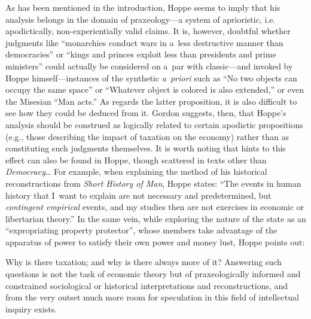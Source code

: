 As has been mentioned in the introduction, Hoppe seems to imply that his analysis belongs in the domain of praxeology---a system of aprioristic, i.e. apodictically, non-experientially valid claims. It is, however, doubtful whether judgments like ``monarchies conduct wars in a~less destructive manner than democracies'' or ``kings and princes exploit less than presidents and prime ministers'' could actually be considered on a~par with classic---and invoked by Hoppe 
\parencite*[][p.xvi]{hoppe_democracy_2007} %
 himself---instances of the synthetic \textit{a~priori} such as ``No two objects can occupy the same space'' or ``Whatever object is colored is also extended,'' or even the Misesian ``Man acts.'' As regards the latter proposition, it is also difficult to see how they could be deduced from it. Gordon 
\parencite*[][p.99]{gordon_austro-libertarian_2017} %
 suggests, then, that Hoppe's analysis should be construed as logically related to certain apodictic propositions (e.g., those describing the impact of taxation on the economy) rather than as constituting such judgments themselves. It is worth noting that hints to this effect can also be found in Hoppe, though scattered in texts other than \textit{Democracy}… For example, when explaining the method of his historical reconstructions from \textit{Short History of Man}, Hoppe 
\parencite*[][p.16]{hoppe_short_2015} %
 states: ``The events in human history that I~want to explain are not necessary and predetermined, but \textit{contingent empirical} events, and my studies then are not exercises in economic or libertarian theory.'' In the same vein, while exploring the nature of the state as an ``expropriating property protector'', whose members take advantage of the apparatus of power to satisfy their own power and money lust, Hoppe 
\parencite*[][p.33]{hoppe_economics_2006} %
 points out:



Why is there taxation; and why is there always more of it? Answering such questions is not the task of economic theory but of praxeologically informed and constrained sociological or historical interpretations and reconstructions, and from the very outset much more room for speculation in this field of intellectual inquiry exists.



